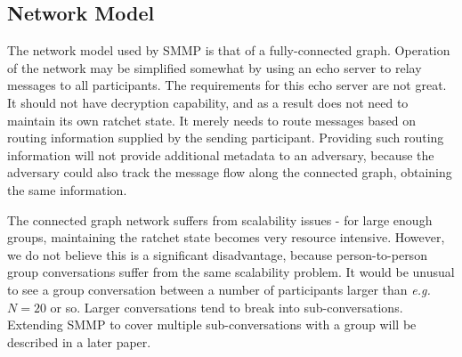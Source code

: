 \documentclass[%
preprint,
amsmath,amssymb,
aps,
prb,
floatfix,
]{revtex4-1}
\begin{document}
\subsection{\label{sec:networkmodel}Network Model}
The network model used by SMMP is that of a fully-connected graph.
Operation of the network may be simplified somewhat by using an echo server to
relay messages to all participants. The requirements for this echo server are
not great. It should not have decryption capability, and as a result does not
need to maintain its own ratchet state. It merely needs to route messages based
on routing information supplied by the sending participant. Providing such routing
information will not provide additional metadata to an adversary, because the
adversary could also track the message flow along the connected graph, obtaining
the same information.

The connected graph network suffers from scalability issues - for large enough
groups, maintaining the ratchet state becomes very resource intensive. However,
we do not believe this is a significant disadvantage, because person-to-person
group conversations suffer from the same scalability problem. It  would be
unusual to see a group conversation between a number of participants larger
than \textit{e.g.} $N = 20$ or so. Larger conversations tend to break into
sub-conversations.
Extending SMMP to cover multiple sub-conversations with a group will be
described in a later paper.
\end{document}
